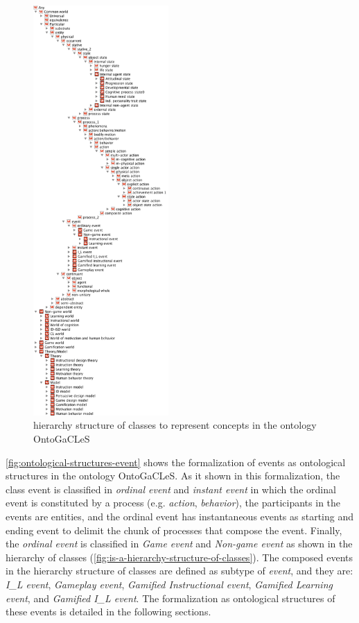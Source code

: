 \begin{figure}[!htb]
 \caption{ hierarchy structure of classes to represent concepts in the ontology OntoGaCLeS}
 \label{fig:is-a-hierarchy-structure-of-classes}
 \centering
 \includegraphics[width=0.46\textwidth]{images/chap-ontogacles2/is-a-hierarchy-structure-of-classes.png}
 \fautor
\end{figure}
\newpage

\autoref{fig:ontological-structures-event} shows the formalization of events as ontological structures in the ontology OntoGaCLeS. As it shown in this formalization, the class event is classified in \emph{ordinal event} and \emph{instant event} in which the ordinal event is constituted by a process (e.g. \emph{action}, \emph{behavior}), the participants in the events are entities, and the ordinal event has instantaneous events as starting and ending event to delimit the chunk of processes that compose the event. Finally, the \emph{ordinal event} is classified in \emph{Game event} and \emph{Non-game event} as shown in the  hierarchy of classes (\autoref{fig:is-a-hierarchy-structure-of-classes}). The composed events in the  hierarchy structure of classes are defined as subtype of \emph{event}, and they are: \emph{I\_L event}, \emph{Gameplay event}, \emph{Gamified Instructional event}, \emph{Gamified Learning event}, and \emph{Gamified I\_L event}.
The formalization as ontological structures of these events is detailed in the following sections.

